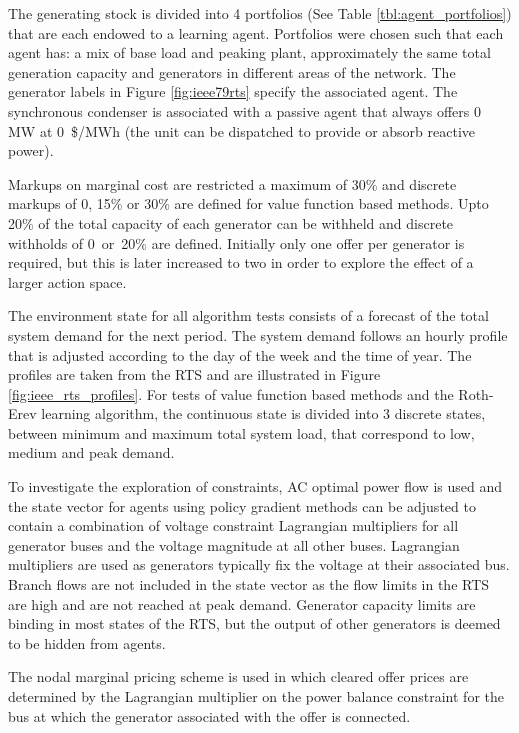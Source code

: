The generating stock is divided into 4 portfolios (See Table
\ref{tbl:agent_portfolios}) that are each endowed to a learning agent.
Portfolios were chosen such that each agent has: a mix of base load and peaking
plant, approximately the same total generation capacity and generators in
different areas of the network.  The generator labels in Figure
\ref{fig:ieee79rts} specify the associated agent.  The synchronous condenser is
associated with a passive agent that always offers 0 MW at 0~\$/MWh (the
unit can be dispatched to provide or absorb reactive power).


Markups on marginal cost are restricted a maximum of 30\% and discrete markups
of 0, 15\% or 30\% are defined for value function based methods.  Upto 20\% of
the total capacity of each generator can be withheld and discrete withholds of
0~or~20\% are defined.  Initially only one offer per generator is required, but
this is later increased to two in order to explore the effect of a larger
action space.

The environment state for all algorithm tests consists of a forecast of the
total system demand for the next period.  The system demand follows an hourly
profile that is adjusted according to the day of the week and the time of year.
The profiles are taken from the RTS and are illustrated in Figure
\ref{fig:ieee_rts_profiles}.  For tests of value function based methods and the
Roth-Erev learning algorithm, the continuous state is divided into 3 discrete
states, between minimum and maximum total system load, that correspond to low,
medium and peak demand.

To investigate the exploration of constraints, AC optimal power flow is used and
the state vector for agents using policy gradient methods can be adjusted to
contain a combination of voltage constraint Lagrangian multipliers for all
generator buses and the voltage magnitude at all other buses.  Lagrangian
multipliers are used as generators typically fix the voltage at their associated
bus.  Branch flows are not included in the state vector as the flow limits in
the RTS are high and are not reached at peak demand.  Generator capacity limits
are binding in most states of the RTS, but the output of other generators is
deemed to be hidden from agents.

The nodal marginal pricing scheme is used in which cleared offer prices are
determined by the Lagrangian multiplier on the power balance constraint for the
bus at which the generator associated with the offer is connected.

